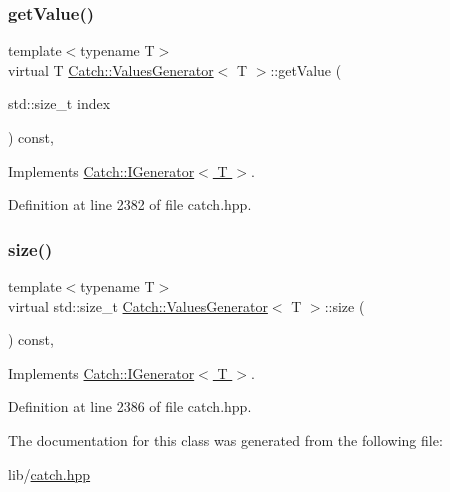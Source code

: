 \subsubsection{\texorpdfstring{get\+Value()}{getValue()}}
{\footnotesize\ttfamily template$<$typename T$>$ \\
virtual T \hyperlink{class_catch_1_1_values_generator}{Catch\+::\+Values\+Generator}$<$ T $>$\+::get\+Value (\begin{DoxyParamCaption}\item[{std\+::size\+\_\+t}]{index }\end{DoxyParamCaption}) const\hspace{0.3cm}{\ttfamily [inline]}, {\ttfamily [virtual]}}



Implements \hyperlink{struct_catch_1_1_i_generator_ad69e937cb66dba3ed9429c42abf4fce3}{Catch\+::\+I\+Generator$<$ T $>$}.



Definition at line 2382 of file catch.\+hpp.

\hypertarget{class_catch_1_1_values_generator_a9aa5b140ee502975cf35115e534ab771}{}\label{class_catch_1_1_values_generator_a9aa5b140ee502975cf35115e534ab771} 
\subsubsection{\texorpdfstring{size()}{size()}}
{\footnotesize\ttfamily template$<$typename T$>$ \\
virtual std\+::size\+\_\+t \hyperlink{class_catch_1_1_values_generator}{Catch\+::\+Values\+Generator}$<$ T $>$\+::size (\begin{DoxyParamCaption}{ }\end{DoxyParamCaption}) const\hspace{0.3cm}{\ttfamily [inline]}, {\ttfamily [virtual]}}



Implements \hyperlink{struct_catch_1_1_i_generator_a2e317253b03e838b6065ce69719a198e}{Catch\+::\+I\+Generator$<$ T $>$}.



Definition at line 2386 of file catch.\+hpp.



The documentation for this class was generated from the following file\+:\begin{DoxyCompactItemize}
\item 
lib/\hyperlink{catch_8hpp}{catch.\+hpp}\end{DoxyCompactItemize}
